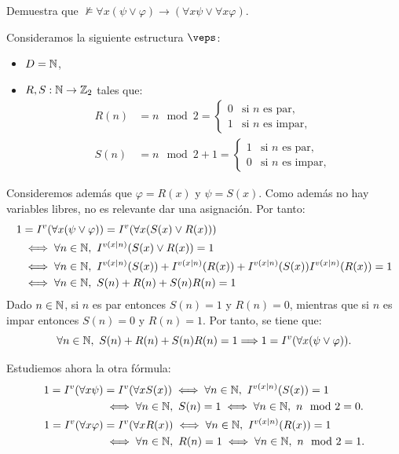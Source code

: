 \begin{ejercicio}\label{ej:2.7}
    Demuestra que $\not\models \forall x(\psi \vee \varphi) \rightarrow (\forall x \psi \vee \forall x \varphi)$.

    Consideramos la siguiente estructura $\veps$:
    \begin{itemize}
        \item $D = \mathbb{N}$,
        \item $R,S:\mathbb{N}\rightarrow\mathbb{Z}_2$ tales que:
        \begin{align*}
            R(n) &= n\mod 2=\begin{cases}
                0 & \text{si }n\text{ es par},\\
                1 & \text{si }n\text{ es impar},
            \end{cases}\\
            S(n) &= n\mod 2+1=\begin{cases}
                1 & \text{si }n\text{ es par},\\
                0 & \text{si }n\text{ es impar},
            \end{cases}
        \end{align*}
    \end{itemize}

    Consideremos además que $\varphi=R(x)$ y $\psi=S(x)$. Como además no hay variables libres, no es relevante dar una asignación. Por tanto:
    \begin{align*}
        1 &= I^v(\forall x(\psi \vee \varphi))= I^v(\forall x(S(x) \vee R(x))) 
        \\&\iff \forall n\in\mathbb{N},\ I^{v(x\mid n)}(S(x) \vee R(x)) = 1\\
        &\iff \forall n\in\mathbb{N},\ I^{v(x\mid n)}(S(x)) + I^{v(x\mid n)}(R(x)) + I^{v(x\mid n)}(S(x))I^{v(x\mid n)}(R(x)) = 1\\
        &\iff \forall n\in\mathbb{N},\ S(n) + R(n) + S(n)R(n) = 1\\
    \end{align*}
    Dado $n\in \mathbb{N}$, si $n$ es par entonces $S(n)=1$ y $R(n)=0$, mientras que si $n$ es impar entonces $S(n)=0$ y $R(n)=1$. Por tanto, se tiene que:
    \begin{equation*}
        \forall n\in\mathbb{N},\ S(n) + R(n) + S(n)R(n) = 1 \Longrightarrow 1=I^v(\forall x(\psi \vee \varphi)).
    \end{equation*}

    Estudiemos ahora la otra fórmula:
    \begin{align*}
        1 = I^v(\forall x \psi)&=I^v(\forall x S(x)) \iff \forall n\in\bb{N},\ I^{v(x\mid n)}(S(x)) = 1\\
        &\iff \forall n\in\bb{N},\ S(n) = 1\iff \forall n\in\bb{N},\ n\mod 2 = 0.\\
        1 = I^v(\forall x \varphi)&=I^v(\forall x R(x)) \iff \forall n\in\bb{N},\ I^{v(x\mid n)}(R(x)) = 1\\
        &\iff \forall n\in\bb{N},\ R(n) = 1\iff \forall n\in\bb{N},\ n\mod 2 = 1.
    \end{align*}


\end{ejercicio}
